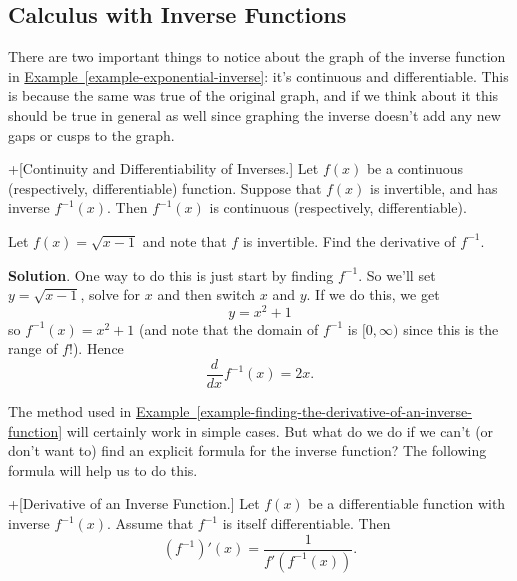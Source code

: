 \documentclass[10pt,]{book}
\theoremstyle{ptxplainnotitle}
\theoremstyle{ptxplaintitle}
\theoremstyle{ptxplainnotitle}
\theoremstyle{ptxplaintitle}
\theoremstyle{ptxplainnotitle}
\theoremstyle{ptxplaintitle}
\theoremstyle{ptxdefinitionnotitle}
\theoremstyle{ptxdefinitiontitle}
\theoremstyle{ptxdefinitionnotitle}
\theoremstyle{ptxdefinitiontitle}
\theoremstyle{ptxdefinitionnotitle}
\theoremstyle{ptxdefinitiontitle}
\theoremstyle{ptxdefinitionnotitle}
\theoremstyle{ptxdefinitiontitle}
\theoremstyle{ptxdefinitionnotitle}
\theoremstyle{ptxdefinitiontitle}
\numberwithin{equation}{section}
\newcommand{\dv}[3][]{\dfrac{d^{#1} #2}{d #3^{#1}}}
\begin{document}
\subsection[{Calculus with Inverse Functions}]{Calculus with Inverse Functions}\label{subsection-calculus-with-inverse-functions}
\hypertarget{p-206}{}%
There are two important things to notice about the graph of the inverse function in \hyperref[example-exponential-inverse]{Example~\ref{example-exponential-inverse}}: it's continuous and differentiable. This is because the same was true of the original graph, and if we think about it this should be true in general as well since graphing the inverse doesn't add any new gaps or cusps to the graph.%
\begin{theorem}+[{Continuity and Differentiability of Inverses.}]\label{theorem-continuity-and-differentiability-of-inverses}
\hypertarget{p-207}{}%
Let \(f(x)\) be a continuous (respectively, differentiable) function. Suppose that \(f(x)\) is invertible, and has inverse \(f^{-1}(x)\). Then \(f^{-1}(x)\) is continuous (respectively, differentiable).%
\end{theorem}
\begin{example}\label{example-finding-the-derivative-of-an-inverse-function}
\hypertarget{p-208}{}%
Let \(f(x) = \sqrt{x-1}\) and note that \(f\) is invertible. Find the derivative of \(f^{-1}\).%
\par\smallskip%
\noindent\textbf{Solution}.\hypertarget{solution-45}{}\quad%
\hypertarget{p-209}{}%
One way to do this is just start by finding \(f^{-1}\). So we'll set \(y = \sqrt{x-1}\), solve for \(x\) and then switch \(x\) and \(y\). If we do this, we get%
\begin{equation*}
y = x^{2} + 1
\end{equation*}
so \(f^{-1}(x) = x^{2} + 1\) (and note that the domain of \(f^{-1}\) is \([0,\infty)\) since this is the range of \(f\)!). Hence%
\begin{equation*}
\dv{}{x}f^{-1}(x) = 2x.
\end{equation*}
%
\end{example}
\hypertarget{p-210}{}%
The method used in \hyperref[example-finding-the-derivative-of-an-inverse-function]{Example~\ref{example-finding-the-derivative-of-an-inverse-function}} will certainly work in simple cases. But what do we do if we can't (or don't want to) find an explicit formula for the inverse function? The following formula will help us to do this.%
\begin{theorem}+[{Derivative of an Inverse Function.}]\label{theorem-derivative-of-an-inverse-function}
\hypertarget{p-211}{}%
Let \(f(x)\) be a differentiable function with inverse \(f^{-1}(x)\). Assume that \(f^{-1}\) is itself differentiable. Then%
\begin{equation*}
(f^{-1})'(x) = \frac{1}{f'(f^{-1}(x))}.
\end{equation*}
%
\end{theorem}
\end{document}
